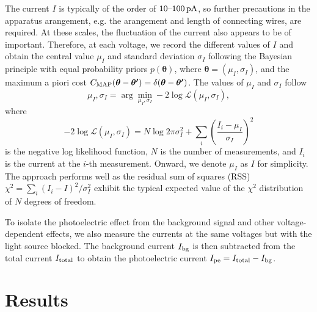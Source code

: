 \documentclass[aps,twocolumn,secnumarabic,balancelastpage,amsmath,amssymb,nofootinbib,floatfix]{revtex4-1}
\newcommand{\pA}{\,{\rm pA}}
\begin{document}
The current $I$ is typically of the order of $10 \text{--} 100\pA$, so further precautions in the apparatus arangement, e.g. the arangement and length of connecting wires, are required. At these scales, the fluctuation of the current also appears to be of important. Therefore, at each voltage, we record the different values of $I$ and obtain the central value $\mu_I$ and standard deviation $\sigma_I$ following the Bayesian principle with equal probability priors $p(\boldsymbol{\theta})$, where $\boldsymbol{\theta} = (\mu_I,\sigma_I)$, and the maximum a piori cost $C_{\rm{MAP}} (\boldsymbol{\theta} - \boldsymbol{\theta^\prime}) = \delta (\boldsymbol{\theta} - \boldsymbol{\theta^\prime})$. The values of $\mu_I$ and $\sigma_I$ follow
\begin{equation}
    \label{eqn:I_bayesian}
    \mu_I,\sigma_I =  \arg \min_{\mu_I,\sigma_I} - 2 \log{\mathcal{L} (\mu_I,\sigma_I)},
\end{equation}
where
\begin{equation}
    \label{eqn:I_NLL}
    - 2 \log{\mathcal{L} (\mu_I,\sigma_I)} = N \log{2 \pi \sigma_I^2} + \sum_i \left(\frac{I_i - \mu_I}{\sigma_I}\right)^2
\end{equation}
is the negative log likelihood function, $N$ is the number of measurements, and $I_i$ is the current at the $i$-th measurement. Onward, we denote $\mu_I$ as $I$ for simplicity. The approach performs well as the residual sum of squares (RSS) $\chi^2 = \sum_i (I_i - I)^2 / \sigma_I^2$ exhibit the typical expected value of the $\chi^2$ distribution of $N$ degrees of freedom.

To isolate the photoelectric effect from the background signal and other voltage-dependent effects, we also measure the currents at the same voltages but with the light source blocked. The background current $I_{\rm{bg}}$ is then subtracted from the total current $I_{\rm{total}}$ to obtain the photoelectric current $I_{\rm{pe}} = I_{\rm{total}} - I_{\rm{bg}}$.


\section{Results}
\label{sec:result}
\end{document}
